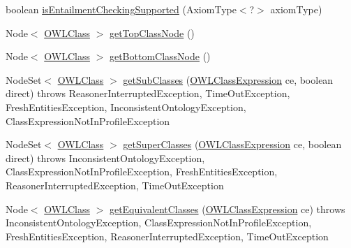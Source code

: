 \begin{DoxyCompactItemize}
\item 
boolean \hyperlink{interfaceorg_1_1semanticweb_1_1owlapi_1_1reasoner_1_1_o_w_l_reasoner_ada02e7fc9aed4a3df8c0bfecc3917aa9}{is\-Entailment\-Checking\-Supported} (Axiom\-Type$<$?$>$ axiom\-Type)
\item 
Node$<$ \hyperlink{interfaceorg_1_1semanticweb_1_1owlapi_1_1model_1_1_o_w_l_class}{O\-W\-L\-Class} $>$ \hyperlink{interfaceorg_1_1semanticweb_1_1owlapi_1_1reasoner_1_1_o_w_l_reasoner_a8d066ecd9e77ee8e287b04bbfdb04f56}{get\-Top\-Class\-Node} ()
\item 
Node$<$ \hyperlink{interfaceorg_1_1semanticweb_1_1owlapi_1_1model_1_1_o_w_l_class}{O\-W\-L\-Class} $>$ \hyperlink{interfaceorg_1_1semanticweb_1_1owlapi_1_1reasoner_1_1_o_w_l_reasoner_a1b77133bcd305cbf3340a3fd14a4cf27}{get\-Bottom\-Class\-Node} ()
\item 
Node\-Set$<$ \hyperlink{interfaceorg_1_1semanticweb_1_1owlapi_1_1model_1_1_o_w_l_class}{O\-W\-L\-Class} $>$ \hyperlink{interfaceorg_1_1semanticweb_1_1owlapi_1_1reasoner_1_1_o_w_l_reasoner_a30bc6e45c539a716c9bf2c702b622edc}{get\-Sub\-Classes} (\hyperlink{interfaceorg_1_1semanticweb_1_1owlapi_1_1model_1_1_o_w_l_class_expression}{O\-W\-L\-Class\-Expression} ce, boolean direct)  throws Reasoner\-Interrupted\-Exception, Time\-Out\-Exception, Fresh\-Entities\-Exception, Inconsistent\-Ontology\-Exception, Class\-Expression\-Not\-In\-Profile\-Exception
\item 
Node\-Set$<$ \hyperlink{interfaceorg_1_1semanticweb_1_1owlapi_1_1model_1_1_o_w_l_class}{O\-W\-L\-Class} $>$ \hyperlink{interfaceorg_1_1semanticweb_1_1owlapi_1_1reasoner_1_1_o_w_l_reasoner_a8a8617949b6669d58e78a368babdab69}{get\-Super\-Classes} (\hyperlink{interfaceorg_1_1semanticweb_1_1owlapi_1_1model_1_1_o_w_l_class_expression}{O\-W\-L\-Class\-Expression} ce, boolean direct)  throws Inconsistent\-Ontology\-Exception, Class\-Expression\-Not\-In\-Profile\-Exception, Fresh\-Entities\-Exception, Reasoner\-Interrupted\-Exception, Time\-Out\-Exception
\item 
Node$<$ \hyperlink{interfaceorg_1_1semanticweb_1_1owlapi_1_1model_1_1_o_w_l_class}{O\-W\-L\-Class} $>$ \hyperlink{interfaceorg_1_1semanticweb_1_1owlapi_1_1reasoner_1_1_o_w_l_reasoner_afb7eb24f8c48371c8903a617a185929c}{get\-Equivalent\-Classes} (\hyperlink{interfaceorg_1_1semanticweb_1_1owlapi_1_1model_1_1_o_w_l_class_expression}{O\-W\-L\-Class\-Expression} ce)  throws Inconsistent\-Ontology\-Exception, Class\-Expression\-Not\-In\-Profile\-Exception, Fresh\-Entities\-Exception, Reasoner\-Interrupted\-Exception, Time\-Out\-Exception

\end{DoxyCompactItemize}
